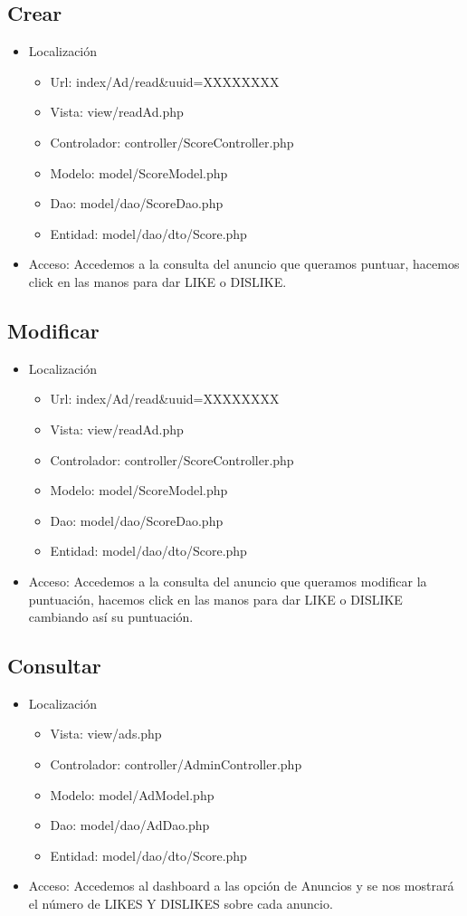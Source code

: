 \subsection{Crear}
\begin{itemize}
\item Localizaci\'{o}n
\begin{itemize}
\item Url: index/Ad/read\&uuid=XXXXXXXX
\item Vista: view/readAd.php
\item Controlador: controller/ScoreController.php
\item Modelo: model/ScoreModel.php
\item Dao: model/dao/ScoreDao.php
\item Entidad: model/dao/dto/Score.php
\end{itemize}
\item Acceso: Accedemos a la consulta del anuncio que queramos puntuar, hacemos click en las manos para dar LIKE o DISLIKE.
\end{itemize}

\subsection{Modificar}
\begin{itemize}
\item Localizaci\'{o}n
\begin{itemize}
\item Url: index/Ad/read\&uuid=XXXXXXXX
\item Vista: view/readAd.php
\item Controlador: controller/ScoreController.php
\item Modelo: model/ScoreModel.php
\item Dao: model/dao/ScoreDao.php
\item Entidad: model/dao/dto/Score.php
\end{itemize}
\item Acceso: Accedemos a la consulta del anuncio que queramos modificar la puntuaci\'{o}n, hacemos click en las manos para dar LIKE o DISLIKE cambiando as\'{i} su puntuaci\'{o}n.
\end{itemize}

\subsection{Consultar}
\begin{itemize}
\item Localizaci\'{o}n
\begin{itemize}
\item Vista: view/ads.php
\item Controlador: controller/AdminController.php
\item Modelo: model/AdModel.php
\item Dao: model/dao/AdDao.php
\item Entidad: model/dao/dto/Score.php
\end{itemize}
\item Acceso: Accedemos al dashboard a las opci\'{o}n de Anuncios y se nos mostrar\'{a} el n\'{u}mero de LIKES Y DISLIKES sobre cada anuncio.
\end{itemize}

